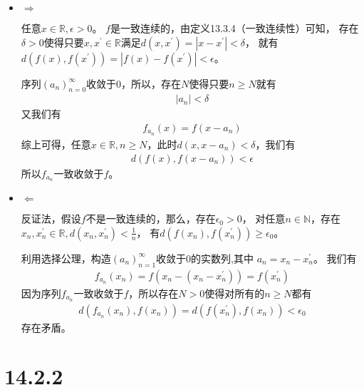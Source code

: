 \documentclass{article}
\begin{document}
\begin{itemize}
  \item $\Rightarrow$

        任意$x \in \mathbb{R}, \epsilon > 0$。
        $f$是一致连续的，由定义13.3.4（一致连续性）可知，
        存在$\delta > 0$使得只要$x, x^\prime \in \mathbb{R}$满足$d(x, x^\prime) = |x - x^\prime| < \delta$，
        就有$d(f(x), f(x^\prime)) = |f(x) - f(x^\prime)|< \epsilon$。

        序列$(a_n)_{n = 0}^\infty$收敛于$0$，所以，存在$N$使得只要$n \geq N$就有
        \begin{align*}
          |a_n| < \delta
        \end{align*}
        又我们有
        \begin{align*}
          f_{a_n}(x) = f(x - a_n)
        \end{align*}
        综上可得，任意$x \in \mathbb{R}, n \geq N$，此时$d(x, x - a_n) < \delta$，我们有
        \begin{align*}
          d(f(x), f(x - a_n)) < \epsilon
        \end{align*}
        所以$f_{a_n}$一致收敛于$f$。

  \item $\Leftarrow$

        反证法，假设$f$不是一致连续的，那么，存在$\epsilon_0 > 0$，
        对任意$n \in \mathbb{N}$，存在$x_n, x_n^\prime \in \mathbb{R}, d(x_n, x_n^\prime) < \frac{1}{n}$，
        有$d(f(x_n), f(x_n^\prime)) \geq \epsilon_0$。

        利用选择公理，构造$(a_n)_{n = 1}^\infty$收敛于$0$的实数列,其中 $a_n = x_n - x_n^\prime$。
        我们有
        \begin{align*}
          f_{a_n}(x_n) = f(x_n - (x_n - x_n^\prime)) = f(x_n^\prime)
        \end{align*}
        因为序列$f_{a_n}$一致收敛于$f$，所以存在$N > 0$使得对所有的$n \geq N$都有
        \begin{align*}
          d(f_{a_n}(x_n), f(x_n)) = d(f(x_n^\prime), f(x_n)) < \epsilon_0
        \end{align*}
        存在矛盾。

\end{itemize}

\section*{14.2.2}
\end{document}
